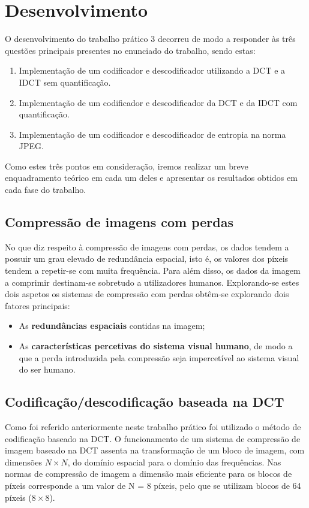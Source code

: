 \documentclass[12pt,a4paper]{article}
\begin{document}
\newpage

\section{Desenvolvimento}
O desenvolvimento do trabalho prático 3 decorreu de modo a responder às três questões principais presentes no enunciado do trabalho, sendo estas:
\begin{enumerate}
\item Implementação de um codificador e descodificador utilizando a DCT e a IDCT sem quantificação.
\item Implementação de um codificador e descodificador da DCT e da IDCT com quantificação.
\item Implementação de um codificador e descodificador de entropia na norma JPEG.
\end{enumerate}
Como estes três pontos em consideração, iremos realizar um breve enquadramento teórico em cada um deles e apresentar os resultados obtidos em cada fase do trabalho.

\subsection{Compressão de imagens com perdas}
No que diz respeito à compressão de imagens com perdas, os dados tendem a possuir um grau elevado de redundância espacial, isto é, os valores dos píxeis tendem a repetir-se com muita frequência. Para além disso, os dados da imagem a comprimir destinam-se sobretudo a utilizadores humanos. Explorando-se estes dois aspetos os sistemas de compressão com perdas obtêm-se explorando dois fatores principais:
\begin{itemize}
 \item As \textbf{redundâncias espaciais} contidas na imagem;
 \item As \textbf{características percetivas do sistema visual humano}, de modo a que a perda introduzida pela compressão seja impercetível  ao sistema visual do ser humano.
 \end{itemize} 
\newpage
\subsection{Codificação/descodificação baseada na DCT}
Como foi referido anteriormente neste trabalho prático foi utilizado o método de codificação baseado na DCT. O funcionamento de um sistema de compressão de imagem baseado na DCT assenta na transformação de um bloco de imagem, com dimensões $N\times N$, do domínio espacial para o domínio das frequências. Nas normas de compressão de imagem a dimensão mais eficiente para os blocos de píxeis corresponde a um valor de N = 8 píxeis, pelo que se utilizam blocos de 64 píxeis ($8\times 8$).\\
\end{document}
